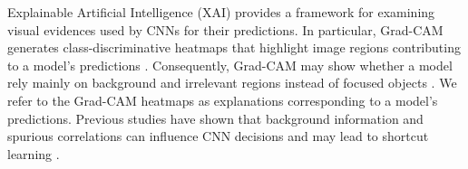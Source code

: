 \documentclass[a4paper,fleqn]{cas-dc}
\begin{document}
	Explainable Artificial Intelligence (XAI) provides a framework for examining visual evidences used by CNNs for their predictions. 
	In particular, Grad-CAM generates class-discriminative heatmaps that highlight image regions contributing to a model's predictions \cite{ref7, ref8}. 
	Consequently, Grad-CAM may show whether a model rely mainly on  background and irrelevant regions instead of  focused objects \cite{ ref9, ref10}. 
	We refer to the Grad-CAM heatmaps as explanations corresponding to a model's predictions. 
	Previous studies have shown that background information and spurious correlations can influence CNN decisions and may lead to shortcut learning \cite{r11, r12, r13}. %
	
\end{document}
